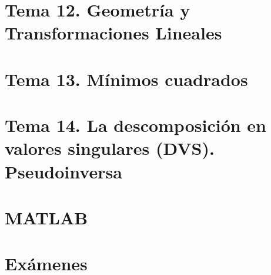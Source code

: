 \documentclass[12pt, twoside, openright]{report} %
\begin{document}
\part{Tema 12. Geometría y Transformaciones Lineales}




\part{Tema 13. Mínimos cuadrados}





\part{Tema 14. La descomposición en valores singulares (DVS). Pseudoinversa}





\part{MATLAB}




\part{Exámenes}














\end{document}
